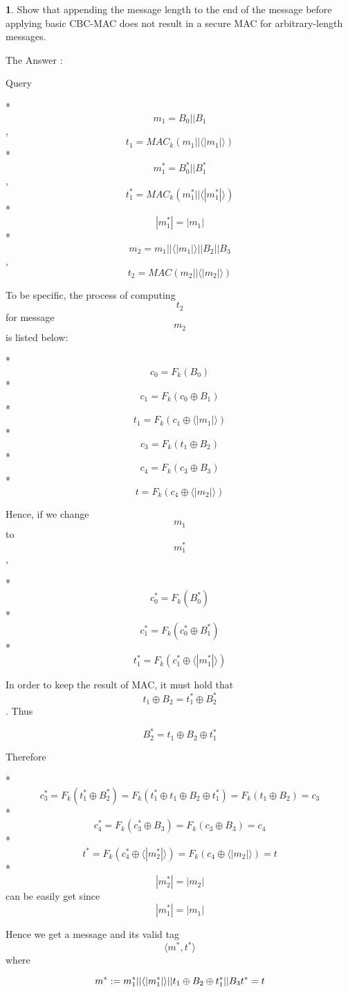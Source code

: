 \documentclass{article}
\theoremstyle{definition}
\theoremstyle{definition}
\theoremstyle{definition}
\newtheorem{solution-internal}{}[subsection]
\newenvironment{solution}{
  \begin{solution-internal}
}{
  \end{solution-internal}
}
\begin{document}
\begin{solution}
  Show that appending the message length to the end of the message before applying basic CBC-MAC does not result in a secure MAC for arbitrary-length messages.
  
  The Answer : 
  
  Query

* $$m_1 = B_0 || B_1$$, $$t_1 = MAC_k(m_1 || \langle |m_1| \rangle)$$
* $$m^*_1 = B^*_0 || B^*_1$$,  $$t^*_1 = MAC_k(m^*_1 || \langle |m^*_1| \rangle)$$
  * $$ |m^*_1| = |m_1|$$
* $$m_2 = m_1 || \langle |m_1| \rangle || B_2 || B_3$$, $$t_2 = MAC(m_2 || \langle |m_2| \rangle)$$

To be specific, the process of computing $$t_2$$ for message $$m_2$$ is listed below:

* $$c_0=F_k(B_0)$$
* $$c_1=F_k(c_0 \oplus B_1)$$
* $$ t_1=F_k(c_1 \oplus \langle |m_1| \rangle) $$
* $$ c_3=F_k(t_1 \oplus B_2) $$
* $$ c_4=F_k(c_3 \oplus B_3) $$
* $$ t=F_k(c_4 \oplus \langle | m_2 | \rangle) $$

Hence, if we change $$m_1$$ to $$ m^*_1 $$,

* $$c^*_0=F_k(B^*_0)$$
* $$c^*_1=F_k(c^*_0 \oplus B^*_1)$$
* $$ t^*_1=F_k(c^*_1 \oplus \langle |m^*_1| \rangle) $$

In order to keep the result of MAC, it must hold that $$ t_1 \oplus B_2 = t_1^* \oplus B^*_2$$. Thus

$$
B^*_2 = t_1 \oplus B_2 \oplus  t_1^*
$$

Therefore

* $$ c^*_3=F_k(t^*_1 \oplus B^*_2) = F_k(t^*_1 \oplus  t_1 \oplus B_2 \oplus  t_1^*) = F_k(t_1 \oplus B_2) = c_3$$
* $$ c^*_4 = F_k(c^*_3 \oplus B_3) = F_k(c_3 \oplus B_3) = c_4$$
* $$ t^* = F_k(c^*_4 \oplus \langle | m^*_2 | \rangle)  = F_k(c_4 \oplus \langle | m_2 | \rangle) =t$$
  * $$ |m^*_2|=|m_2|$$ can be easily get since $$ |m^*_1| = |m_1| $$

Hence we get a message and its valid tag $$\langle m^*, t^* \rangle $$ where

$$
m^* := m^*_1 || \langle | m^*_1| \rangle || t_1 \oplus B_2 \oplus  t_1^* || B_3 \\
t^* = t
$$

\end{solution}
\end{document}
